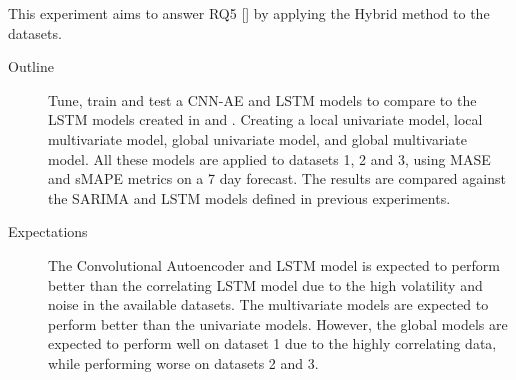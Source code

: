 This experiment aims to answer RQ5 [] by applying the Hybrid method
to the datasets.


\begin{description}
  \item[Outline]{
              Tune, train and test a CNN-AE and LSTM models to compare to the LSTM models
              created in  and .
              Creating a local univariate model, local multivariate model, global univariate model, and global multivariate model.
              All these models are applied to datasets 1, 2 and 3, using MASE and sMAPE metrics on a 7 day forecast.
              The results are compared against the SARIMA and LSTM models defined in previous experiments.
        }
\end{description}

\begin{description}
  \item[Expectations]{
              The Convolutional Autoencoder and LSTM model is expected to perform better than the correlating LSTM model
              due to the high volatility and noise in the available datasets.
              The multivariate models are expected to perform better than the univariate models.
              However, the global models are expected to perform well on dataset 1 due to the highly correlating data,
              while performing worse on datasets 2 and 3.
        }
\end{description}